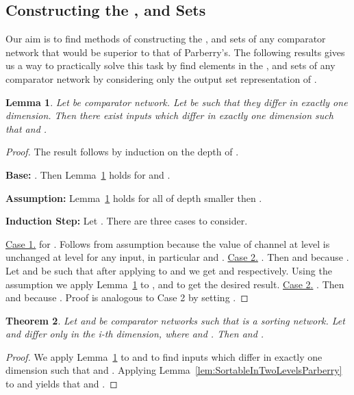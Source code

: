 \documentclass[13pt,a4paper]{article}
\newtheorem{theorem}{Theorem}[section]
\newtheorem{lemma}[theorem]{Lemma}
\begin{document}
\subsection{Constructing the ,  and  Sets}
\label{sec:construct_reach}

Our aim is to find methods of constructing the ,  and  sets of any comparator network  that would be superior to that of Parberry's. The following results gives us a way to practically solve this task by find elements in the ,  and  sets of any comparator network  by considering only the output set representation  of . 

\begin{lemma}
\label{lem:OutputSetsDiff}
Let  be comparator network. Let  be such that they differ in exactly one dimension. Then there exist inputs  which differ in exactly one dimension such that  and . 
\end{lemma}

\begin{proof}
The result follows by induction on the depth  of .

\textbf{Base:}
. Then Lemma~\ref{lem:OutputSetsDiff} holds for  and .

\textbf{Assumption:}
Lemma~\ref{lem:OutputSetsDiff} holds for all  of depth smaller then .

\textbf{Induction Step:}
Let . There are three cases to consider.

\indent
\indent
\underline{Case 1.}  for .
\indent
Follows from assumption because the value of channel  at level  is unchanged at level  for any input, in particular  and .
\newline
\indent
\indent
\underline{Case 2.} .
\indent
Then  and  because . 
Let  and  be such that after applying  to  and  we get  and  respectively. Using the assumption we apply Lemma~\ref{lem:OutputSetsDiff} to ,  and  to get the desired result.
\newline
\indent
\indent
\underline{Case 2.} .
\indent
Then  and  because . Proof is analogous to Case 2 by setting .

\end{proof}

\begin{theorem}
\label{th:construct_reach}
Let  and  be comparator networks such that  is a sorting network. Let  and  differ only in the i-th dimension, where  and .  Then  and .
\end{theorem}

\begin{proof}
We apply Lemma~\ref{lem:OutputSetsDiff} to  and  to find inputs  which differ in exactly one dimension such that  and . Applying Lemma~\ref{lem:SortableInTwoLevelsParberry} to  and  yields that  and .
\end{proof}
\end{document}
